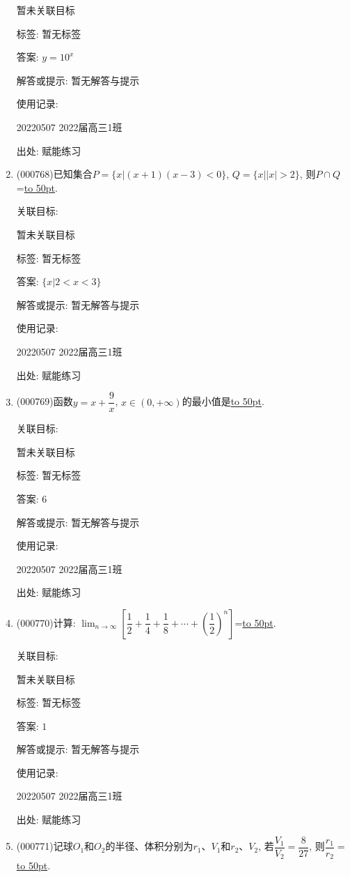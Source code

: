 \documentclass[10pt,a4paper]{article}
\newcommand{\blank}[1]{\underline{\hbox to #1pt{}}}
\begin{document}
\begin{enumerate}[1.]
暂未关联目标



标签: 暂无标签

答案: $y=10^x$

解答或提示: 暂无解答与提示

使用记录:

20220507	2022届高三1班	


出处: 赋能练习
\item { (000768)}已知集合$P=\{x|(x+1)(x-3)<0\}$, $Q=\{x||x|>2\}$, 则$P\cap Q$=\blank{50}.


关联目标:

暂未关联目标



标签: 暂无标签

答案: $\{x|2<x<3\}$

解答或提示: 暂无解答与提示

使用记录:

20220507	2022届高三1班	


出处: 赋能练习
\item { (000769)}函数$y=x+\dfrac9x$, $x\in (0,+\infty)$的最小值是\blank{50}.


关联目标:

暂未关联目标



标签: 暂无标签

答案: $6$

解答或提示: 暂无解答与提示

使用记录:

20220507	2022届高三1班	


出处: 赋能练习
\item { (000770)}计算: $\displaystyle\lim_{n\to\infty}[\dfrac12+\dfrac14+\dfrac18+\cdots+(\dfrac12)^n]$=\blank{50}.


关联目标:

暂未关联目标



标签: 暂无标签

答案: $1$

解答或提示: 暂无解答与提示

使用记录:

20220507	2022届高三1班	


出处: 赋能练习
\item { (000771)}记球$O_1$和$O_2$的半径、体积分别为$r_1$、$V_1$和$r_2$、$V_2$, 若$\dfrac{V_1}{V_2}=\dfrac8{27}$, 则$\dfrac{r_1}{r_2}=$\blank{50}.



\end{enumerate}
\end{document}
